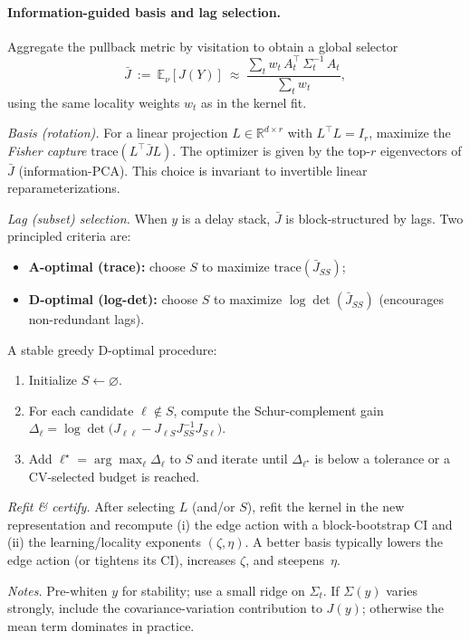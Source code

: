 \documentclass[11pt]{article}
\newcommand{\R}{\mathbb{R}}
\newcommand{\E}{\mathbb{E}}
\newcommand{\1}{\mathbf{1}}
\begin{document}
\paragraph{Information-guided basis and lag selection.}
Aggregate the pullback metric by visitation to obtain a global selector
\[
\bar J\ :=\ \E_\nu[J(Y)]\ \approx\ \frac{\sum_t w_t\,A_t^\top\,\Sigma_t^{-1}\,A_t}{\sum_t w_t},
\]
using the same locality weights $w_t$ as in the kernel fit.

\emph{Basis (rotation).} For a linear projection $L\in\R^{d\times r}$ with $L^\top L=I_r$, maximize the
\emph{Fisher capture} $\mathrm{trace}(L^\top \bar J L)$. The optimizer is given by the top-$r$
eigenvectors of $\bar J$ (information-PCA). This choice is invariant to invertible linear reparameterizations.

\emph{Lag (subset) selection.} When $y$ is a delay stack, $\bar J$ is block-structured by lags.
Two principled criteria are:
\begin{itemize}[leftmargin=1.4em,itemsep=1pt,topsep=2pt]
\item \textbf{A-optimal (trace):} choose $S$ to maximize $\mathrm{trace}(\bar J_{SS})$;
\item \textbf{D-optimal (log-det):} choose $S$ to maximize $\log\det(\bar J_{SS})$ (encourages non-redundant lags).
\end{itemize}
A stable greedy D-optimal procedure:
\begin{enumerate}[leftmargin=1.4em,itemsep=1pt,topsep=2pt]
\item Initialize $S\gets\varnothing$.
\item For each candidate $\ell\notin S$, compute the Schur-complement gain
$\Delta_\ell=\log\det\!\big(J_{\ell\ell}-J_{\ell S}J_{SS}^{-1}J_{S\ell}\big)$.
\item Add $\ell^\star=\arg\max_\ell \Delta_\ell$ to $S$ and iterate until $\Delta_{\ell^\star}$ is below a tolerance or a CV-selected budget is reached.
\end{enumerate}

\emph{Refit \& certify.} After selecting $L$ (and/or $S$), refit the kernel in the new representation and
recompute (i) the edge action with a block-bootstrap CI and (ii) the learning/locality exponents $(\zeta,\eta)$.
A better basis typically lowers the edge action (or tightens its CI), increases $\zeta$, and steepens~$\eta$.

\emph{Notes.} Pre-whiten $y$ for stability; use a small ridge on $\Sigma_t$.
If $\Sigma(y)$ varies strongly, include the covariance-variation contribution to $J(y)$; otherwise the mean term dominates in practice.
\end{document}
